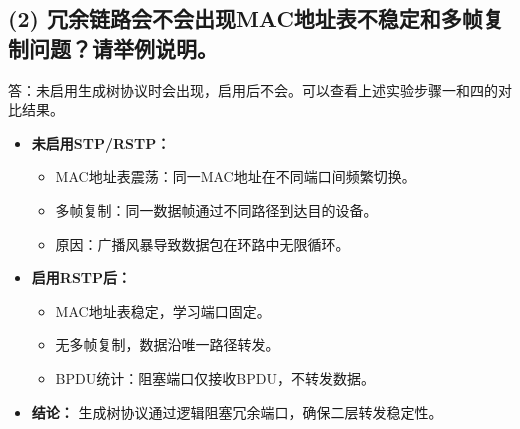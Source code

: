 \documentclass[a4paper]{article}
\begin{document}
\subsection*{(2) 冗余链路会不会出现MAC地址表不稳定和多帧复制问题？请举例说明。}
答：未启用生成树协议时会出现，启用后不会。可以查看上述实验步骤一和四的对比结果。
\begin{itemize}
    \item \textbf{未启用STP/RSTP：}
    \begin{itemize}
        \item MAC地址表震荡：同一MAC地址在不同端口间频繁切换。
        \item 多帧复制：同一数据帧通过不同路径到达目的设备。
        \item 原因：广播风暴导致数据包在环路中无限循环。
    \end{itemize}
    \item \textbf{启用RSTP后：}
    \begin{itemize}
        \item MAC地址表稳定，学习端口固定。
        \item 无多帧复制，数据沿唯一路径转发。
        \item BPDU统计：阻塞端口仅接收BPDU，不转发数据。
    \end{itemize}
    \item \textbf{结论：} 生成树协议通过逻辑阻塞冗余端口，确保二层转发稳定性。
\end{itemize}
\end{document}
